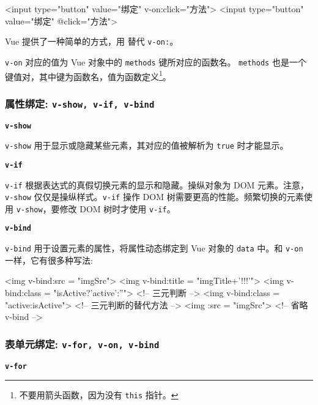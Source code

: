 \begin{HTML}
<input type="button" value="绑定" v-on:click="方法">
<input type="button" value="绑定" @click="方法">
\end{HTML}

Vue 提供了一种简单的方式，用 \@ 替代 \texttt{v-on:}。

\texttt{v-on} 对应的值为 Vue 对象中的 \texttt{methods} 键所对应的函数名。 \texttt{methods} 也是一个键值对，其中键为函数名，值为函数定义\footnote{不要用箭头函数，因为没有 \texttt{this} 指针。}。



\subsubsection{属性绑定: \texttt{v-show, v-if, v-bind}}

\noindent\textbf{\texttt{v-show}}

\texttt{v-show} 用于显示或隐藏某些元素，其对应的值被解析为 \texttt{true} 时才能显示。



\noindent\textbf{\texttt{v-if}}

\texttt{v-if} 根据表达式的真假切换元素的显示和隐藏。操纵对象为 DOM 元素。注意，\texttt{v-show} 仅仅是操纵样式。\texttt{v-if} 操作 DOM 树需要更高的性能。频繁切换的元素使用 \texttt{v-show}，要修改 DOM 树时才使用 \texttt{v-if}。



\noindent\textbf{\texttt{v-bind}}

\texttt{v-bind} 用于设置元素的属性，将属性动态绑定到 Vue 对象的 \texttt{data} 中。和 \texttt{v-on} 一样，它有很多种写法:

\begin{HTML}
<img v-bind:src = "imgSrc">
<img v-bind:title = "imgTitle+'!!!'">
<img v-bind:class = "isActive?'active':''"> <!-- 三元判断 -->
<img v-bind:class = "{active:isActive}">    <!-- 三元判断的替代方法 -->
<img :src = "imgSrc">   <!-- 省略 v-bind -->
\end{HTML}



\subsubsection{表单元绑定: \texttt{v-for, v-on, v-bind}}
\noindent\textbf{\texttt{v-for}}

